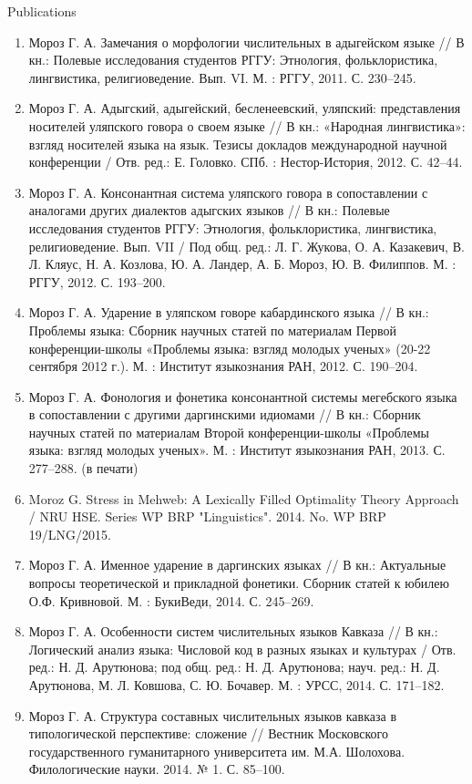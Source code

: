 \documentclass{resume} %
\begin{document}
\begin{rSection}{Publications}
\begin{enumerate}
\item Мороз Г. А. Замечания о морфологии числительных в адыгейском языке // В кн.: Полевые исследования студентов РГГУ: Этнология, фольклористика, лингвистика, религиоведение. Вып. VI. М. : РГГУ, 2011. С. 230--245.
\item Мороз Г. А. Адыгский, адыгейский, бесленеевский, уляпский: представления носителей уляпского говора о своем языке // В кн.: «Народная лингвистика»: взгляд носителей языка на язык. Тезисы докладов международной научной конференции / Отв. ред.: Е. Головко. СПб. : Нестор-История, 2012. С. 42--44.
\item Мороз Г. А. Консонантная система уляпского говора в сопоставлении с аналогами других диалектов адыгских языков // В кн.: Полевые исследования студентов РГГУ: Этнология, фольклористика, лингвистика, религиоведение. Вып. VII / Под общ. ред.: Л. Г. Жукова, О. А. Казакевич, В. Л. Кляус, Н. А. Козлова, Ю. А. Ландер, А. Б. Мороз, Ю. В. Филиппов. М. : РГГУ, 2012. С. 193--200.
\item Мороз Г. А. Ударение в уляпском говоре кабардинского языка // В кн.: Проблемы языка: Сборник научных статей по материалам Первой конференции-школы «Проблемы языка: взгляд молодых ученых» (20-22 сентября 2012 г.). М. : Институт языкознания РАН, 2012. С. 190--204.
\item Мороз Г. А. Фонология и фонетика консонантной системы мегебского языка в сопоставлении с другими даргинскими идиомами // В кн.: Сборник научных статей по материалам Второй конференции-школы «Проблемы языка: взгляд молодых ученых». М. : Институт языкознания РАН, 2013. С. 277--288. (в печати)
\item Moroz G. Stress in Mehweb: A Lexically Filled Optimality Theory Approach / NRU HSE. Series WP BRP "Linguistics". 2014. No. WP BRP 19/LNG/2015.
\item Мороз Г. А. Именное ударение в даргинских языках // В кн.: Актуальные вопросы теоретической и прикладной фонетики. Сборник статей к юбилею О.Ф. Кривновой. М. : БукиВеди, 2014. С. 245--269.
\item Мороз Г. А. Особенности систем числительных языков Кавказа // В кн.: Логический анализ языка: Числовой код в разных языках и культурах / Отв. ред.: Н. Д. Арутюнова; под общ. ред.: Н. Д. Арутюнова; науч. ред.: Н. Д. Арутюнова, М. Л. Ковшова, С. Ю. Бочавер. М. : УРСС, 2014. С. 171--182.
\item Мороз Г. А. Структура составных числительных языков кавказа в типологической перспективе: сложение // Вестник Московского государственного гуманитарного университета им. М.А. Шолохова. Филологические науки. 2014. № 1. С. 85--100.

\end{enumerate}
\end{rSection}
\end{document}
